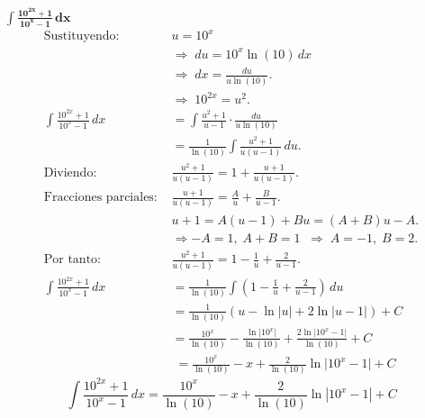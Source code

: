 $\displaystyle \mathbf{\int \frac{10^{2x} + 1}{10^{x} - 1}\,dx}$
\nopagebreak
\begin{align*}
\text{Sustituyendo: } &u = 10^{x} \;\;\\[6pt]
&\Rightarrow\; du = 10^{x}\ln(10)\,dx\\[6pt]
&\Rightarrow\; dx = \frac{du}{u\ln(10)}. \\[6pt]
&\Rightarrow\; 10^{2x} = u^{2}. \\[6pt]
\int \frac{10^{2x} + 1}{10^{x} - 1}\,dx
&= \int \frac{u^{2} + 1}{u - 1}\cdot\frac{du}{u\ln(10)} \\[6pt]
&= \frac{1}{\ln(10)}\int \frac{u^{2} + 1}{u(u - 1)}\,du. \\[6pt]
\text{Diviendo: } &\frac{u^{2} + 1}{u(u-1)} = 1 + \frac{u + 1}{u(u-1)}. \\[6pt]
\text{Fracciones parciales: } &\frac{u + 1}{u(u-1)} = \frac{A}{u} + \frac{B}{u-1}. \\[4pt]
&u + 1 = A(u-1) + Bu = (A + B)u - A. \\[4pt]
&\Rightarrow -A = 1,\; A + B = 1 \;\;\Rightarrow\; A = -1,\; B = 2. \\[6pt]
\text{Por tanto: } &\frac{u^{2} + 1}{u(u-1)} = 1 - \frac{1}{u} + \frac{2}{u - 1}. \\[6pt]
\int \frac{10^{2x} + 1}{10^{x} - 1}\,dx
&= \frac{1}{\ln(10)}\int \left(1 - \frac{1}{u} + \frac{2}{u - 1}\right)\,du \\[6pt]
&= \frac{1}{\ln(10)}\left(u - \ln|u| + 2\ln|u - 1|\right) + C \\[6pt]
&= \frac{10^{x}}{\ln(10)} - \frac{\ln\!\bigl|10^{x}\bigr|}{\ln(10)} + \frac{2\ln\!\bigl|10^{x} - 1\bigr|}{\ln(10)} + C \\[6pt]
&\;= \frac{10^{x}}{\ln(10)} - x + \frac{2}{\ln(10)}\ln\!\bigl|10^{x} - 1\bigr| + C
\end{align*}
\[
\boxed{\displaystyle 
\int \frac{10^{2x} + 1}{10^{x} - 1}\,dx
= \frac{10^{x}}{\ln(10)} - x + \frac{2}{\ln(10)}\ln\!\left|10^{x} - 1\right| + C}
\]
